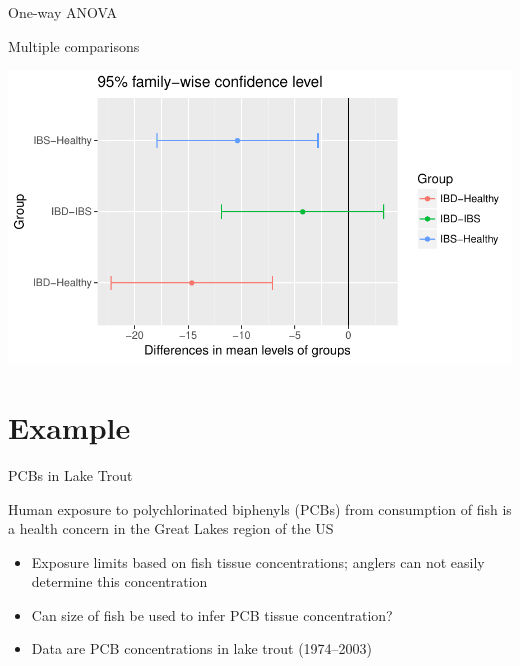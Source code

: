 \documentclass[10pt,ignorenonframetext,compress, aspectratio=169]{beamer}
\providecommand{\tightlist}{%
  \setlength{\itemsep}{0pt}\setlength{\parskip}{0pt}}
\begin{document}
\begin{frame}{One-way ANOVA}

Multiple comparisons

\begin{center}\includegraphics[width=0.7\linewidth]{03-linear-models_files/figure-beamer/verbal-2-plot-1} \end{center}

\end{frame}

\section{Example}\label{example}

\begin{frame}{PCBs in Lake Trout}

Human exposure to polychlorinated biphenyls (PCBs) from consumption of
fish is a health concern in the Great Lakes region of the US

\begin{itemize}
\tightlist
\item
  Exposure limits based on fish tissue concentrations; anglers can not
  easily determine this concentration
\item
  Can size of fish be used to infer PCB tissue concentration?
\item
  Data are PCB concentrations in lake trout (1974--2003)
\end{itemize}

\end{frame}
\end{document}

